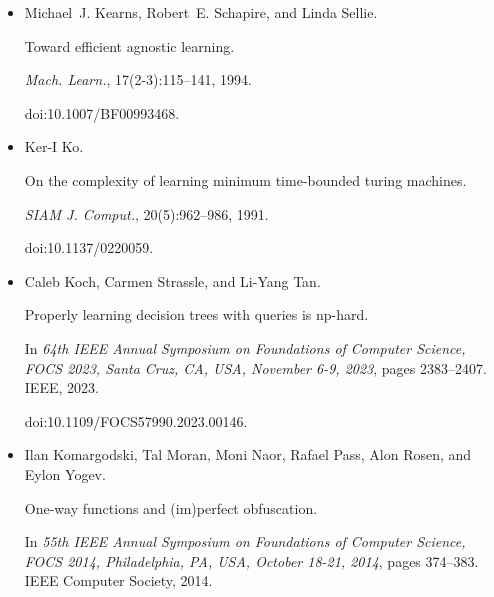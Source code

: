 \begin{itemize}
Valentine Kabanets and Jin-yi Cai.


Circuit minimization problem.


In F. Frances Yao and Eugene M. Luks, editors, \emph{Proceedings of
the Thirty-Second Annual ACM Symposium on Theory of Computing, May 21-23,
2000, Portland, OR, USA}, pages 73–79. ACM, 2000.


doi:10.1145/335305.335314.





\item[] 
[30]

Michael J. Kearns, Robert E. Schapire, and Linda Sellie.


Toward efficient agnostic learning.


\emph{Mach. Learn.}, 17(2-3):115–141, 1994.


doi:10.1007/BF00993468.





\item[] 
[31]

Ker-I Ko.


On the complexity of learning minimum time-bounded turing machines.


\emph{SIAM J. Comput.}, 20(5):962–986, 1991.


doi:10.1137/0220059.





\item[] 
[32]

Caleb Koch, Carmen Strassle, and Li-Yang Tan.


Properly learning decision trees with queries is np-hard.


In \emph{64th IEEE Annual Symposium on Foundations of Computer
Science, FOCS 2023, Santa Cruz, CA, USA, November 6-9, 2023}, pages
2383–2407. IEEE, 2023.


doi:10.1109/FOCS57990.2023.00146.





\item[] 
[33]

Ilan Komargodski, Tal Moran, Moni Naor, Rafael Pass, Alon Rosen, and Eylon
Yogev.


One-way functions and (im)perfect obfuscation.


In \emph{55th IEEE Annual Symposium on Foundations of Computer
Science, FOCS 2014, Philadelphia, PA, USA, October 18-21, 2014}, pages
374–383. IEEE Computer Society, 2014.



\end{itemize}
